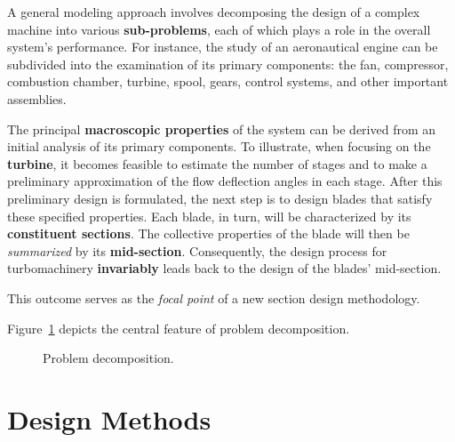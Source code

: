 A general modeling approach involves decomposing the design of a complex machine into various \textbf{sub-problems}, 
each of which plays a role in the overall system's performance. For instance, the study of an aeronautical engine 
can be subdivided into the examination of its primary components: the fan, compressor, combustion chamber, turbine, spool, gears, control systems, 
and other important assemblies.

The principal \textbf{macroscopic properties} of the system can be derived from an initial analysis of 
its primary components. To illustrate, when focusing on the \textbf{turbine}, it becomes feasible to 
estimate the number of stages and to make a preliminary approximation of the flow deflection angles in each stage. 
After this preliminary design is formulated, the next step is to design blades that satisfy these specified properties. 
Each blade, in turn, will be characterized by its \textbf{constituent sections}. The collective properties of the blade will 
then be \textit{summarized} by its \textbf{mid-section}. Consequently, the design process for turbomachinery \textbf{invariably} leads back to 
the design of the blades' mid-section.

This outcome serves as the \textit{focal point} of a new section design methodology. 

Figure~\ref{fig:decomposition} depicts the central feature of problem decomposition.

\begin{figure}[!h]
    \centering
    
    \caption{Problem decomposition.}
    \label{fig:decomposition}
\end{figure}

\section{Design Methods}



